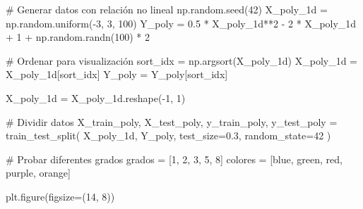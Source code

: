 \documentclass[
  doc,
  floatsintext,
  longtable,
  a4paper,
  nolmodern,
  notxfonts,
  notimes,
  12pt,
  colorlinks=true,linkcolor=blue,citecolor=blue,urlcolor=blue]{apa7}
\newenvironment{Shaded}{\begin{snugshade}}{\end{snugshade}}
\newcommand{\CommentTok}[1]{\textcolor[rgb]{0.37,0.37,0.37}{#1}}
\newcommand{\DecValTok}[1]{\textcolor[rgb]{0.68,0.00,0.00}{#1}}
\newcommand{\FloatTok}[1]{\textcolor[rgb]{0.68,0.00,0.00}{#1}}
\newcommand{\NormalTok}[1]{\textcolor[rgb]{0.00,0.23,0.31}{#1}}
\newcommand{\OperatorTok}[1]{\textcolor[rgb]{0.37,0.37,0.37}{#1}}
\newcommand{\StringTok}[1]{\textcolor[rgb]{0.13,0.47,0.30}{#1}}
\begin{document}
\begin{Shaded}
\begin{Highlighting}[]
\CommentTok{\# Generar datos con relación no lineal}
\NormalTok{np.random.seed(}\DecValTok{42}\NormalTok{)}
\NormalTok{X\_poly\_1d }\OperatorTok{=}\NormalTok{ np.random.uniform(}\OperatorTok{{-}}\DecValTok{3}\NormalTok{, }\DecValTok{3}\NormalTok{, }\DecValTok{100}\NormalTok{)}
\NormalTok{Y\_poly }\OperatorTok{=} \FloatTok{0.5} \OperatorTok{*}\NormalTok{ X\_poly\_1d}\OperatorTok{**}\DecValTok{2} \OperatorTok{{-}} \DecValTok{2} \OperatorTok{*}\NormalTok{ X\_poly\_1d }\OperatorTok{+} \DecValTok{1} \OperatorTok{+}\NormalTok{ np.random.randn(}\DecValTok{100}\NormalTok{) }\OperatorTok{*} \DecValTok{2}

\CommentTok{\# Ordenar para visualización}
\NormalTok{sort\_idx }\OperatorTok{=}\NormalTok{ np.argsort(X\_poly\_1d)}
\NormalTok{X\_poly\_1d }\OperatorTok{=}\NormalTok{ X\_poly\_1d[sort\_idx]}
\NormalTok{Y\_poly }\OperatorTok{=}\NormalTok{ Y\_poly[sort\_idx]}

\NormalTok{X\_poly\_1d }\OperatorTok{=}\NormalTok{ X\_poly\_1d.reshape(}\OperatorTok{{-}}\DecValTok{1}\NormalTok{, }\DecValTok{1}\NormalTok{)}

\CommentTok{\# Dividir datos}
\NormalTok{X\_train\_poly, X\_test\_poly, y\_train\_poly, y\_test\_poly }\OperatorTok{=}\NormalTok{ train\_test\_split(}
\NormalTok{    X\_poly\_1d, Y\_poly, test\_size}\OperatorTok{=}\FloatTok{0.3}\NormalTok{, random\_state}\OperatorTok{=}\DecValTok{42}
\NormalTok{)}

\CommentTok{\# Probar diferentes grados}
\NormalTok{grados }\OperatorTok{=}\NormalTok{ [}\DecValTok{1}\NormalTok{, }\DecValTok{2}\NormalTok{, }\DecValTok{3}\NormalTok{, }\DecValTok{5}\NormalTok{, }\DecValTok{8}\NormalTok{]}
\NormalTok{colores }\OperatorTok{=}\NormalTok{ [}\StringTok{\textquotesingle{}blue\textquotesingle{}}\NormalTok{, }\StringTok{\textquotesingle{}green\textquotesingle{}}\NormalTok{, }\StringTok{\textquotesingle{}red\textquotesingle{}}\NormalTok{, }\StringTok{\textquotesingle{}purple\textquotesingle{}}\NormalTok{, }\StringTok{\textquotesingle{}orange\textquotesingle{}}\NormalTok{]}

\NormalTok{plt.figure(figsize}\OperatorTok{=}\NormalTok{(}\DecValTok{14}\NormalTok{, }\DecValTok{8}\NormalTok{))}


\end{Highlighting}
\end{Shaded}
\end{document}
